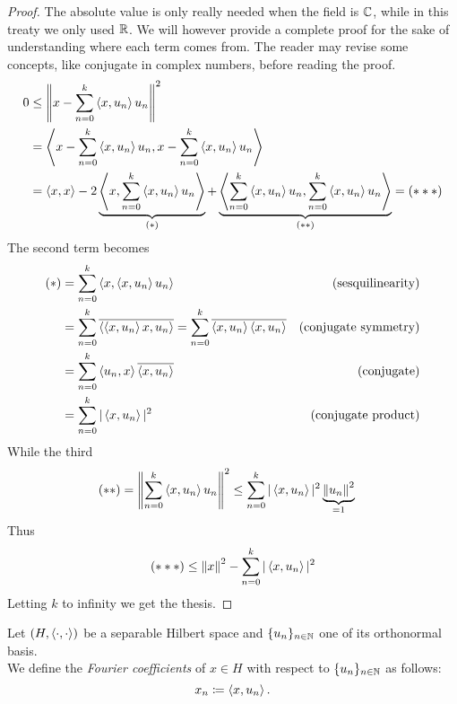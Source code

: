 \begin{proof}
	The absolute value is only really needed when the field is $\mathbb C$, while in this treaty we only used $\mathbb R$. We will however provide a complete proof for the sake of understanding where each term comes from. The reader may revise some concepts, like conjugate in complex numbers, before reading the proof.
	\begin{align*}
	0 & \leq \left\lVert x-\sum\limits_{n=0}^k \left\langle x,u_n\right\rangle u_n\right\rVert^2\\
	 & =\left\langle x-\sum\limits_{n=0}^k \left\langle x,u_n\right\rangle u_n ,x-\sum\limits_{n=0}^k \left\langle x,u_n\right\rangle u_n\right\rangle \\
	 & =\left\langle x,x\right\rangle -2\underbrace{\left\langle x,\sum\limits_{n=0}^k \left\langle x,u_n\right\rangle u_n\right\rangle}_{( *)} +\underbrace{\left\langle \sum\limits_{n=0}^k \left\langle x,u_n\right\rangle u_n ,\sum\limits_{n=0}^k \left\langle x,u_n\right\rangle u_n\right\rangle}_{( **)} =( ***)
	\end{align*}
	The second term becomes
	\begin{align*}
	( *) & =\sum\limits_{n=0}^k \left\langle x,\left\langle x,u_n\right\rangle u_n\right\rangle  & \text{(sesquilinearity)}\\
	 & =\sum\limits_{n=0}^k\overline{\left\langle \left\langle x,u_n\right\rangle x,u_n\right\rangle} =\sum\limits_{n=0}^k\overline{\left\langle x,u_n\right\rangle \left\langle x,u_n\right\rangle} & \text{(conjugate symmetry)}\\
	 & =\sum\limits_{n=0}^k \left\langle u_n ,x\right\rangle \overline{\left\langle x,u_n\right\rangle} & \text{(conjugate)}\\
	 & =\sum\limits_{n=0}^k| \left\langle x,u_n\right\rangle |^2 & \text{(conjugate product)}
	\end{align*}
	While the third
	\begin{align*}
	( **) & =\left\lVert \sum\limits_{n=0}^k \left\langle x,u_n\right\rangle u_n\right\rVert^2 \leq \sum\limits_{n=0}^k| \left\langle x,u_n\right\rangle |^2\underbrace{\left\lVert u_n\right\rVert^2}_{=1}
	\end{align*}
	Thus
	$$
		(***) \leq \left\lVert x\right\rVert^2 -\sum\limits_{n=0}^k| \left\langle x,u_n\right\rangle |^2
	$$
	Letting $k$ to infinity we get the thesis.
\end{proof}


\begin{defn}
	Let $(H, \left\langle\cdot, \cdot\right\rangle )$ be a separable Hilbert space and $\{u_n\}_{n \in \mathbb N}$ one of its orthonormal basis.\\
	We define the \emph{Fourier coefficients} of $x \in H$ with respect to $\{u_n\}_{n \in \mathbb N}$ as follows:
	$$x_n \coloneqq \left\langle x, u_n\right\rangle.$$
\end{defn}

